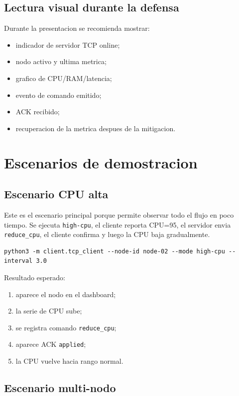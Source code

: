 \documentclass[11pt,letterpaper]{article}
\begin{document}
\subsection{Lectura visual durante la defensa}

Durante la presentacion se recomienda mostrar:

\begin{itemize}
  \item indicador de servidor TCP online;
  \item nodo activo y ultima metrica;
  \item grafico de CPU/RAM/latencia;
  \item evento de comando emitido;
  \item ACK recibido;
  \item recuperacion de la metrica despues de la mitigacion.
\end{itemize}

\newpage
\section{Escenarios de demostracion}

\subsection{Escenario CPU alta}

Este es el escenario principal porque permite observar todo el flujo en poco
tiempo. Se ejecuta \texttt{high-cpu}, el cliente reporta CPU=95, el servidor envia
\texttt{reduce\_cpu}, el cliente confirma y luego la CPU baja gradualmente.

\begin{lstlisting}[style=terminal]
python3 -m client.tcp_client --node-id node-02 --mode high-cpu --interval 3.0
\end{lstlisting}

Resultado esperado:

\begin{enumerate}
  \item aparece el nodo en el dashboard;
  \item la serie de CPU sube;
  \item se registra comando \texttt{reduce\_cpu};
  \item aparece ACK \texttt{applied};
  \item la CPU vuelve hacia rango normal.
\end{enumerate}

\subsection{Escenario multi-nodo}
\end{document}
